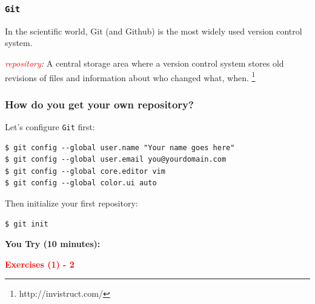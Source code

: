 \documentclass{beamer}
\begin{document}

\begin{frame}
\frametitle{\texttt{Git}}
In the scientific world, Git (and Github) is the most widely used version control system.
\begin{center}
\end{center}\pause
\textit{\textcolor{red}{repository}:} A central storage area where a version control system stores old revisions of files and information about who changed what, when.
\footnote{\footnotesize{http://invistruct.com/}}
\end{frame}

\begin{frame}[fragile]
\frametitle{How do you get your own repository?}
Let's configure \texttt{Git} first:
\begin{verbatim}
$ git config --global user.name "Your name goes here"
$ git config --global user.email you@yourdomain.com
$ git config --global core.editor vim
$ git config --global color.ui auto
\end{verbatim}
Then initialize your first repository:
\begin{verbatim}
$ git init
\end{verbatim}
\begin{center} \pause
\textbf{You Try (10 minutes):}

\textbf{\textcolor{red}{Exercises (1) - 2}}
\end{center}
\end{frame}
\end{document}
